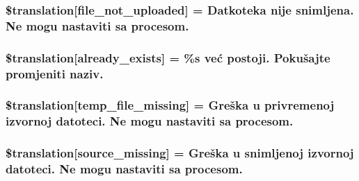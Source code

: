 \subsubsection[{\$translation}]{\setlength{\rightskip}{0pt plus 5cm}\$translation\mbox{[}\textquotesingle{}file\+\_\+not\+\_\+uploaded\textquotesingle{}\mbox{]} = \textquotesingle{}Datkoteka nije snimljena. Ne mogu nastaviti sa procesom.\textquotesingle{}}\label{class_8upload_8hr___h_r_8php_a4ce76e7be0b3a03c2b47f6d70c21832e}
\hypertarget{class_8upload_8hr___h_r_8php_afd84e910217f04139f567c41e292afa5}{}
\subsubsection[{\$translation}]{\setlength{\rightskip}{0pt plus 5cm}\$translation\mbox{[}\textquotesingle{}already\+\_\+exists\textquotesingle{}\mbox{]} = \textquotesingle{}\%s već postoji. Pokušajte promjeniti naziv.\textquotesingle{}}\label{class_8upload_8hr___h_r_8php_afd84e910217f04139f567c41e292afa5}
\hypertarget{class_8upload_8hr___h_r_8php_ab0fa87a88aba2624004581eed0633325}{}
\subsubsection[{\$translation}]{\setlength{\rightskip}{0pt plus 5cm}\$translation\mbox{[}\textquotesingle{}temp\+\_\+file\+\_\+missing\textquotesingle{}\mbox{]} = \textquotesingle{}Greška u privremenoj izvornoj datoteci. Ne mogu nastaviti sa procesom.\textquotesingle{}}\label{class_8upload_8hr___h_r_8php_ab0fa87a88aba2624004581eed0633325}
\hypertarget{class_8upload_8hr___h_r_8php_aceaaf7355acaaf10f0ae60378d03c468}{}
\subsubsection[{\$translation}]{\setlength{\rightskip}{0pt plus 5cm}\$translation\mbox{[}\textquotesingle{}source\+\_\+missing\textquotesingle{}\mbox{]} = \textquotesingle{}Greška u snimljenoj izvornoj datoteci. Ne mogu nastaviti sa procesom.\textquotesingle{}}\label{class_8upload_8hr___h_r_8php_aceaaf7355acaaf10f0ae60378d03c468}
\hypertarget{class_8upload_8hr___h_r_8php_aff2427c72a2598aefa6d58df1dd18b08}{}
